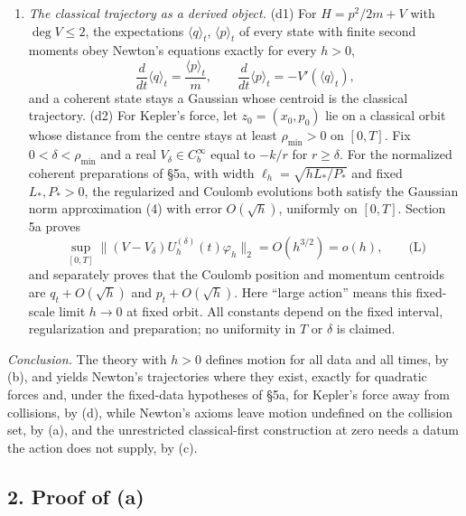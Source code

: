 \documentclass[11pt,a4paper]{article}
\begin{document}
\begin{enumerate}
  paths, and Theorem 2(a) there exhibits one repair, a branch selection
  chosen by hand. The contrast is between the fixed-\(h\) construction,
  which exists for all data, and that specific classical-first
  prescription, which needs a datum the action does not supply; it says
  nothing against the quartic Newtonian initial-value problem itself,
  which is globally well posed.
\item
  \emph{The classical trajectory as a derived object.} (d1) For
  \(H=p^2/2m+V\) with \(\deg V\le2\), the expectations
  \(\langle q\rangle_t\), \(\langle p\rangle_t\) of every state with
  finite second moments obey Newton's equations exactly for every
  \(h>0\),
  \[\frac{d}{dt}\langle q\rangle_t=\frac{\langle p\rangle_t}m,\qquad
  \frac{d}{dt}\langle p\rangle_t=-V'(\langle q\rangle_t),\tag{3}\] and a
  coherent state stays a Gaussian whose centroid is the classical
  trajectory. (d2) For Kepler's force, let \(z_0=(x_0,p_0)\) lie on a
  classical orbit whose distance from the centre stays at least
  \(\rho_{\min}>0\) on \([0,T]\). Fix \(0<\delta<\rho_{\min}\) and a
  real \(V_\delta\in C_b^\infty\) equal to \(-k/r\) for \(r\ge\delta\).
  For the normalized coherent preparations of §5a, with width
  \(\ell_h=\sqrt{hL_*/P_*}\) and fixed \(L_*,P_*>0\), the regularized
  and Coulomb evolutions both satisfy the Gaussian norm approximation
  (4) with error \(O(\sqrt h)\), uniformly on \([0,T]\). Section 5a
  proves \[\sup_{[0,T]}\|(V-V_\delta)U_h^{(\delta)}(t)\varphi_h\|_2
  =O(h^{3/2})=o(h),\qquad\text{(L)}\] and separately proves that the
  Coulomb position and momentum centroids are \(q_t+O(\sqrt h)\) and
  \(p_t+O(\sqrt h)\). Here ``large action'' means this fixed-scale limit
  \(h\to0\) at fixed orbit. All constants depend on the fixed interval,
  regularization and preparation; no uniformity in \(T\) or \(\delta\)
  is claimed.
\end{enumerate}

\emph{Conclusion.} The theory with \(h>0\) defines motion for all data
and all times, by (b), and yields Newton's trajectories where they
exist, exactly for quadratic forces and, under the fixed-data hypotheses
of §5a, for Kepler's force away from collisions, by (d), while Newton's
axioms leave motion undefined on the collision set, by (a), and the
unrestricted classical-first construction at zero needs a datum the
action does not supply, by (c).

\subsection{2. Proof of (a)}\label{proof-of-a}
\end{document}
